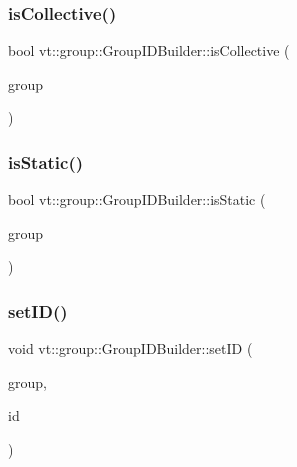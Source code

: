 \subsubsection{\texorpdfstring{is\+Collective()}{isCollective()}}
{\footnotesize\ttfamily bool vt\+::group\+::\+Group\+I\+D\+Builder\+::is\+Collective (\begin{DoxyParamCaption}\item[{\hyperlink{namespacevt_a27b5e4411c9b6140c49100e050e2f743}{Group\+Type} const \&}]{group }\end{DoxyParamCaption})\hspace{0.3cm}{\ttfamily [static]}}

\mbox{\label{structvt_1_1group_1_1_group_i_d_builder_a7f8f671d1716de3777a4c2b05d1426a2}} 
\subsubsection{\texorpdfstring{is\+Static()}{isStatic()}}
{\footnotesize\ttfamily bool vt\+::group\+::\+Group\+I\+D\+Builder\+::is\+Static (\begin{DoxyParamCaption}\item[{\hyperlink{namespacevt_a27b5e4411c9b6140c49100e050e2f743}{Group\+Type} const \&}]{group }\end{DoxyParamCaption})\hspace{0.3cm}{\ttfamily [static]}}

\mbox{\label{structvt_1_1group_1_1_group_i_d_builder_a1e4a17d298d60987acdeabecf71ce339}} 
\subsubsection{\texorpdfstring{set\+I\+D()}{setID()}}
{\footnotesize\ttfamily void vt\+::group\+::\+Group\+I\+D\+Builder\+::set\+ID (\begin{DoxyParamCaption}\item[{\hyperlink{namespacevt_a27b5e4411c9b6140c49100e050e2f743}{Group\+Type} \&}]{group,  }\item[{\hyperlink{namespacevt_1_1group_a805a6643787ae841525c371fd0cefeb3}{Group\+I\+D\+Type} const \&}]{id }\end{DoxyParamCaption})\hspace{0.3cm}{\ttfamily [static]}}

